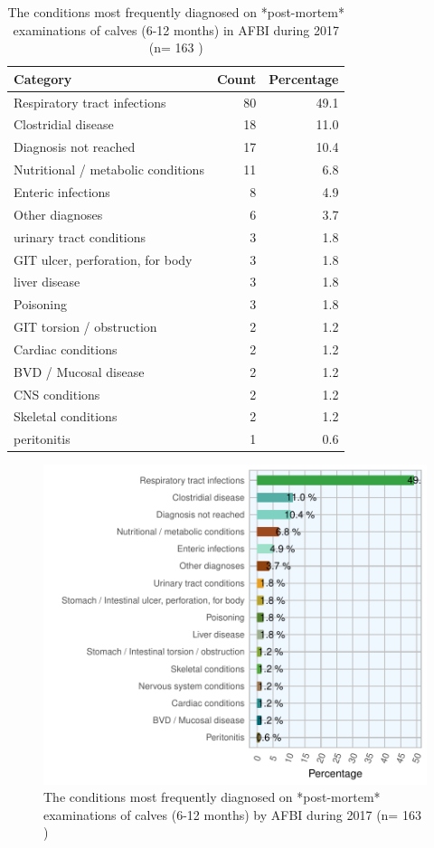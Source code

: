 \documentclass[]{book}
\begin{document}
\begin{table}

\caption{\label{tab:unnamed-chunk-13}The conditions most frequently diagnosed on *post-mortem* examinations of calves (6-12 months) in  AFBI during 2017 (n= 163 )}
\centering
\begin{tabular}[t]{l|r|r}
\hline
Category & Count & Percentage\\
\hline
Respiratory tract infections & 80 & 49.1\\
\hline
Clostridial disease & 18 & 11.0\\
\hline
Diagnosis not reached & 17 & 10.4\\
\hline
Nutritional / metabolic conditions & 11 & 6.8\\
\hline
Enteric infections & 8 & 4.9\\
\hline
Other diagnoses & 6 & 3.7\\
\hline
urinary tract conditions & 3 & 1.8\\
\hline
GIT ulcer, perforation, for body & 3 & 1.8\\
\hline
liver disease & 3 & 1.8\\
\hline
Poisoning & 3 & 1.8\\
\hline
GIT torsion / obstruction & 2 & 1.2\\
\hline
Cardiac conditions & 2 & 1.2\\
\hline
BVD / Mucosal disease & 2 & 1.2\\
\hline
CNS conditions & 2 & 1.2\\
\hline
Skeletal conditions & 2 & 1.2\\
\hline
peritonitis & 1 & 0.6\\
\hline
\end{tabular}
\end{table}

\begin{figure}

{\centering \includegraphics{AFBI_files/figure-latex/unnamed-chunk-14-1} 

}

\caption{The conditions most frequently diagnosed on *post-mortem* examinations of  calves (6-12 months) by AFBI during 2017 (n= 163 )}\label{fig:unnamed-chunk-14}
\end{figure}
\end{document}
